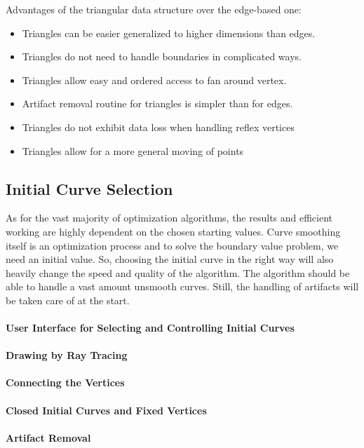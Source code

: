 \documentclass{stdlocal}
\begin{document}
  Advantages of the triangular data structure over the edge-based one:
  \begin{itemize}
    \item Triangles can be easier generalized to higher dimensions than edges.
    \item Triangles do not need to handle boundaries in complicated ways.
    \item Triangles allow easy and ordered access to fan around vertex.
    \item Artifact removal routine for triangles is simpler than for edges.
    \item Triangles do not exhibit data loss when handling reflex vertices
    \item Triangles allow for a more general moving of points
  \end{itemize}

\subsection{Initial Curve Selection} %
\label{sub:initial_curve_selection}
  As for the vast majority of optimization algorithms, the results and efficient working are highly dependent on the chosen starting values.
  Curve smoothing itself is an optimization process and to solve the boundary value problem, we need an initial value.
  So, choosing the initial curve in the right way will also heavily change the speed and quality of the algorithm.
  The algorithm should be able to handle a vast amount unsmooth curves.
  Still, the handling of artifacts will be taken care of at the start.
  \paragraph{User Interface for Selecting and Controlling Initial Curves}
  \paragraph{Drawing by Ray Tracing}
  \paragraph{Connecting the Vertices}
  \paragraph{Closed Initial Curves and Fixed Vertices}
  \paragraph{Artifact Removal}
\end{document}
